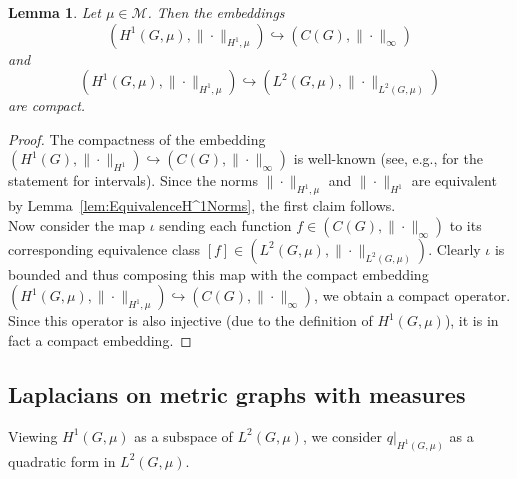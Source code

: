 \documentclass[reqno]{amsart}
\theoremstyle{plain}
\newtheorem{lem}[thm]{Lemma}
\theoremstyle{definition}
\theoremstyle{remark}
\numberwithin{equation}{section}
\newcommand{\cM}{\mathcal{M}}
\begin{document}
\begin{lem} \label{compembed}
	Let $\mu \in \cM$. Then the embeddings
	\[
	(H^1(G, \mu), \|\cdot\|_{H^1, \mu}) \hookrightarrow (C(G), \|\cdot\|_\infty)
	\]
	and
	\[
	(H^1(G, \mu), \|\cdot\|_{H^1, \mu}) \hookrightarrow (L^2(G,  \mu), \|\cdot\|_{L^2(G, \mu)})
	\]
	are compact.
\end{lem}
\begin{proof}
The compactness of the embedding $(H^1(G), \|\cdot\|_{H^1}) \hookrightarrow (C(G), \|\cdot\|_\infty)$ is well-known (see, e.g., \cite[Theorem 8.8]{brezis} for the statement for intervals). Since the norms $\|\cdot\|_{H^1, \mu}$ and $\|\cdot\|_{H^1}$ are equivalent by Lemma~\ref{lem:EquivalenceH^1Norms}, the first claim follows.\\
Now consider the map $\iota$ sending each function $f \in (C(G), \|\cdot\|_{\infty})$ to its corresponding equivalence class $[f] \in (L^2(G, \mu), \|\cdot\|_{L^2(G, \mu)})$. Clearly $\iota$ is bounded and thus composing this map with the compact embedding $(H^1(G, \mu), \|\cdot\|_{H^1, \mu}) \hookrightarrow (C(G), \|\cdot\|_\infty)$, we obtain a compact operator. Since this operator is also injective (due to the definition of $H^1(G, \mu)$), it is in fact a compact embedding. 
\end{proof}


\subsection{Laplacians on metric graphs with measures} \label{ss:LaplacianBasics}

Viewing $H^1(G, \mu)$ as a subspace of $L^2(G,\mu)$, we consider $q\big|_{H^1(G, \mu)}$ as a quadratic form in $L^2(G,\mu)$.
	
\end{document}
